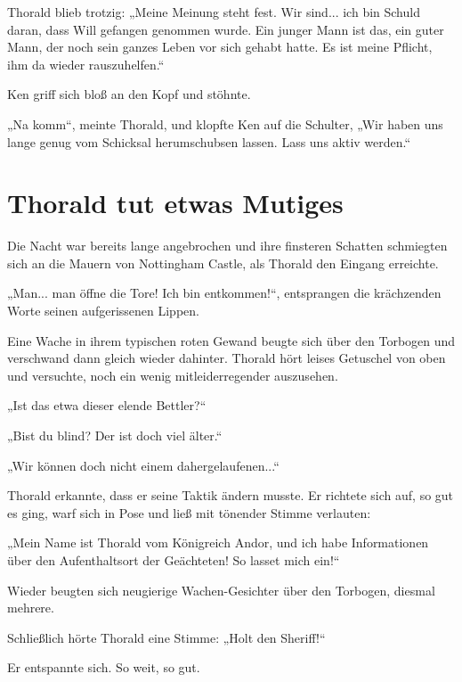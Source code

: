 \documentclass[10pt, a4paper, oneside]{book}
\begin{document}
Thorald blieb trotzig: „Meine Meinung steht fest. Wir sind... ich bin Schuld daran, dass Will gefangen genommen wurde. Ein junger Mann ist das, ein guter Mann, der noch sein ganzes Leben vor sich gehabt hatte. Es ist meine Pflicht, ihm da wieder rauszuhelfen.“

Ken griff sich bloß an den Kopf und stöhnte.

„Na komm“, meinte Thorald, und klopfte Ken auf die Schulter, „Wir haben uns lange genug vom Schicksal herumschubsen lassen. Lass uns aktiv werden.“








\newpage
\section{Thorald tut etwas Mutiges}

Die Nacht war bereits lange angebrochen und ihre finsteren Schatten schmiegten sich an die Mauern von Nottingham Castle, als Thorald den Eingang erreichte.

„Man... man öffne die Tore! Ich bin entkommen!“, entsprangen die krächzenden Worte seinen aufgerissenen Lippen.

Eine Wache in ihrem typischen roten Gewand beugte sich über den Torbogen und verschwand dann gleich wieder dahinter. Thorald hört leises Getuschel von oben und versuchte, noch ein wenig mitleiderregender auszusehen.

„Ist das etwa dieser elende Bettler?“

„Bist du blind? Der ist doch viel älter.“

„Wir können doch nicht einem dahergelaufenen...“

Thorald erkannte, dass er seine Taktik ändern musste. Er richtete sich auf, so gut es ging, warf sich in Pose und ließ mit tönender Stimme verlauten:

„Mein Name ist Thorald vom Königreich Andor, und ich habe Informationen über den Aufenthaltsort der Geächteten! So lasset mich ein!“

Wieder beugten sich neugierige Wachen-Gesichter über den Torbogen, diesmal mehrere.

Schließlich hörte Thorald eine Stimme: „Holt den Sheriff!“

Er entspannte sich. So weit, so gut.\bigskip
\end{document}
